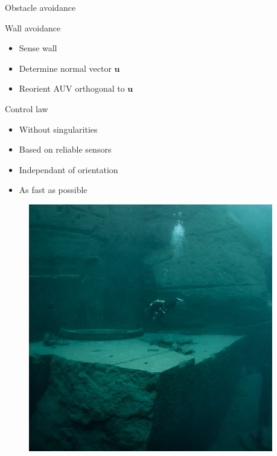 \documentclass[10pt, xcolor={usenames, dvipsnames}]{beamer}
\begin{document}
        \begin{frame}{Obstacle avoidance}
            \begin{minipage}[b]{0.5\textwidth}
                \begin{block}{Wall avoidance}
                    \vspace{0.2cm}
                    \begin{itemize}
                        \item Sense wall \\
                        \item Determine normal vector $\mathbf{u}$ \\
                        \item Reorient AUV orthogonal to $\mathbf{u}$
                    \end{itemize}
                \end{block}
                \begin{block}{Control law}
                    \begin{itemize}
                        \item Without singularities \\
                        \item Based on reliable sensors \\
                        \item Independant of orientation \\
                        \item As fast as possible
                    \end{itemize}
                \end{block}
            \end{minipage}
            \hfill
            \begin{minipage}[b]{0.46\textwidth}
                \begin{figure}
                    \centering
                    \includegraphics[width=0.95\textwidth]{imgs/vodelee.png}

\end{figure}
\end{minipage}
\end{frame}
\end{document}
